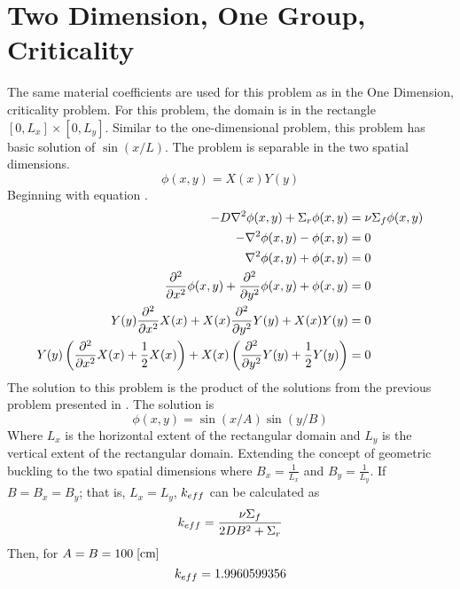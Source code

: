 \section{Two Dimension, One Group, Criticality}
  The same material coefficients are used for this problem as in the 
  One Dimension, criticality problem. For this problem, the domain is in the 
  rectangle $[0,L_x]\times[0,L_y]$. Similar to the one-dimensional problem, 
  this problem has basic solution of $\sin(x/L)$. The problem is separable in 
  the two spatial dimensions. 
  \begin{equation}
    \phi(x,y) = X(x) Y(y) 
  \end{equation}
  Beginning with equation .
  \begin{align}
    -D \mathbf{\nabla}^2 \phi(x,y) + \Sigma_r \phi(x,y) &= \nu \Sigma_f \phi(x,y) \\
    - \mathbf{\nabla}^2 \phi(x,y) - \phi(x,y) &= 0 \\
    \mathbf{\nabla}^2 \phi(x,y) + \phi(x,y) &= 0 \\
    \frac{\partial^2}{\partial x^2} \phi(x,y) + 
      \frac{\partial^2}{\partial y^2} \phi(x,y) +
      \phi(x,y) &= 0\\
    Y(y)\frac{\partial^2}{\partial x^2}X(x) +
      X(x) \frac{\partial^2}{\partial y^2} Y(y) + X(x)Y(y) &= 0\\
    Y(y)\left(\frac{\partial^2}{\partial x^2}X(x) + \frac{1}{2} X(x)\right)+
      X(x)\left(\frac{\partial^2}{\partial y^2}Y(y) + \frac{1}{2}Y(y)
      \right) &= 0
  \end{align}
  The solution to this problem is the product of the solutions from the 
  previous problem presented in . The solution is
  \begin{equation} \label{eq:twodimensionsol}
    \phi(x,y) = \sin(x/A) \sin(y/B)
  \end{equation}
  Where $L_x$ is the horizontal extent of the rectangular domain and $L_y$ is 
  the vertical extent of the rectangular domain. Extending the concept of 
  geometric buckling to the two spatial dimensions where $B_x = \frac{1}{L_x}$
  and $B_y = \frac{1}{L_y}$. If $B=B_x=B_y$; that is, $L_x=L_y$, $k_{eff}$ can 
  be calculated as
  \begin{equation}
    k_{eff} = \frac{\nu \Sigma_f}{2DB^2 + \Sigma_r} 
  \end{equation}
  Then, for $A=B = 100 \;\text{[{cm}]}$
  \begin{equation}
    k_{eff} = 1.9960599356
  \end{equation}
